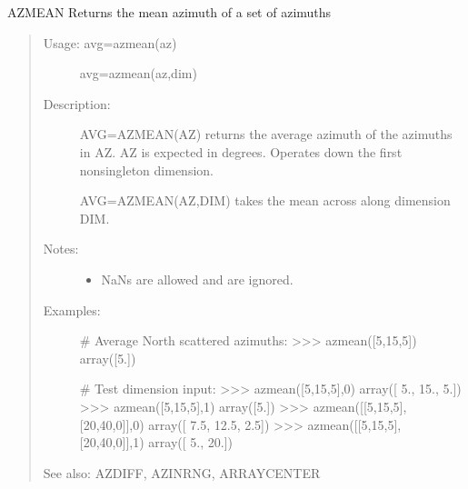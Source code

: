 \documentclass[letterpaper,10pt,english]{sphinxmanual}
\begin{document}
\begin{fulllineitems}
\label{\detokenize{infrapy.utils:infrapy.utils.latlon.azmean}}
AZMEAN    Returns the mean azimuth of a set of azimuths
\begin{quote}
\begin{description}
\item[{Usage:    avg=azmean(az)}] \leavevmode
avg=azmean(az,dim)

\item[{Description:}] \leavevmode
AVG=AZMEAN(AZ) returns the average azimuth of the azimuths in AZ.  AZ
is expected in degrees.  Operates down the first non\sphinxhyphen{}singleton
dimension.

AVG=AZMEAN(AZ,DIM) takes the mean across along dimension DIM.

\item[{Notes:}] \leavevmode\begin{itemize}
\item {} 
NaNs are allowed and are ignored.

\end{itemize}

\item[{Examples:}] \leavevmode
\# Average North scattered azimuths:
\textgreater{}\textgreater{}\textgreater{} azmean({[}\sphinxhyphen{}5,\sphinxhyphen{}15,5{]})
array({[}\sphinxhyphen{}5.{]})

\# Test dimension input:
\textgreater{}\textgreater{}\textgreater{} azmean({[}\sphinxhyphen{}5,\sphinxhyphen{}15,5{]},0)
array({[} \sphinxhyphen{}5., \sphinxhyphen{}15.,   5.{]})
\textgreater{}\textgreater{}\textgreater{} azmean({[}\sphinxhyphen{}5,\sphinxhyphen{}15,5{]},1)
array({[}\sphinxhyphen{}5.{]})
\textgreater{}\textgreater{}\textgreater{} azmean({[}{[}\sphinxhyphen{}5,\sphinxhyphen{}15,5{]},{[}20,40,0{]}{]},0)
array({[}  7.5,  12.5,   2.5{]})
\textgreater{}\textgreater{}\textgreater{} azmean({[}{[}\sphinxhyphen{}5,\sphinxhyphen{}15,5{]},{[}20,40,0{]}{]},1)
array({[} \sphinxhyphen{}5.,  20.{]})

\end{description}

See also: AZDIFF, AZINRNG, ARRAYCENTER
\end{quote}

\end{fulllineitems}

\end{document}

